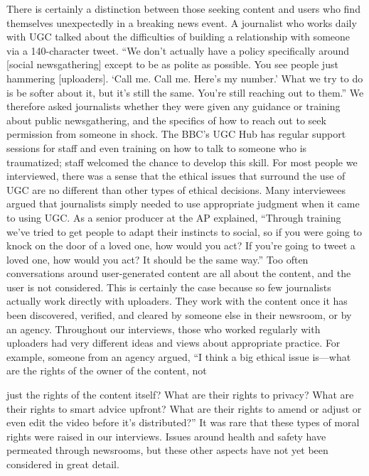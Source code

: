 \begin{enumerate}
There is certainly a distinction between those seeking content and users
who find themselves unexpectedly in a breaking news event. A journalist
who works daily with UGC talked about the difficulties of building a relationship
with someone via a 140-character tweet. ``We don't actually have
a policy specifically around [social newsgathering] except to be as polite
as possible. You see people just hammering [uploaders]. ‘Call me. Call me.
Here's my number.' What we try to do is be softer about it, but it's still the
same. You're still reaching out to them.''
We therefore asked journalists whether they were given any guidance or
training about public newsgathering, and the specifics of how to reach out
to seek permission from someone in shock. The BBC's UGC Hub has regular
support sessions for staff and even training on how to talk to someone
who is traumatized; staff welcomed the chance to develop this skill.
For most people we interviewed, there was a sense that the ethical issues
that surround the use of UGC are no different than other types of ethical
decisions. Many interviewees argued that journalists simply needed to use
appropriate judgment when it came to using UGC. As a senior producer at
the AP explained, ``Through training we've tried to get people to adapt their
instincts to social, so if you were going to knock on the door of a loved one,
how would you act? If you're going to tweet a loved one, how would you act?
It should be the same way.''
Too often conversations around user-generated content are all about the
content, and the user is not considered. This is certainly the case because
so few journalists actually work directly with uploaders. They work with the
content once it has been discovered, verified, and cleared by someone else
in their newsroom, or by an agency. Throughout our interviews, those who
worked regularly with uploaders had very different ideas and views about
appropriate practice. For example, someone from an agency argued, ``I think
a big ethical issue is—what are the rights of the owner of the content, not

just the rights of the content itself? What are their rights to privacy? What
are their rights to smart advice upfront? What are their rights to amend or
adjust or even edit the video before it's distributed?''
It was rare that these types of moral rights were raised in our interviews.
Issues around health and safety have permeated through newsrooms, but
these other aspects have not yet been considered in great detail.

\end{enumerate}
